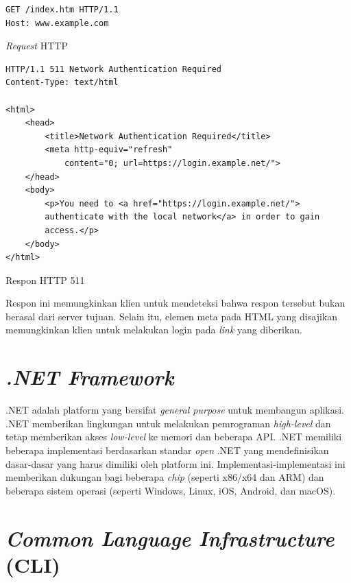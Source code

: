 \begin{listing}[h]
\begin{verbatim}
GET /index.htm HTTP/1.1
Host: www.example.com
\end{verbatim}
\caption{\textit{Request} HTTP}
\label{listing:request_http}
\end{listing}

\begin{listing}[h]
\begin{verbatim}
HTTP/1.1 511 Network Authentication Required
Content-Type: text/html

<html>
    <head>
        <title>Network Authentication Required</title>
        <meta http-equiv="refresh"
            content="0; url=https://login.example.net/">
    </head>
    <body>
        <p>You need to <a href="https://login.example.net/">
        authenticate with the local network</a> in order to gain
        access.</p>
    </body>
</html>
\end{verbatim}
\caption{Respon HTTP 511}
\label{listing:respon_http_511}
\end{listing}

Respon ini memungkinkan klien untuk mendeteksi bahwa respon tersebut bukan berasal dari server tujuan. Selain itu, elemen meta pada HTML yang disajikan memungkinkan klien untuk melakukan login pada \textit{link} yang diberikan.



\section{\textit{.NET Framework}}
\label{sec:net_framework}

.NET adalah platform yang bersifat \textit{general purpose} untuk membangun aplikasi\cite{NET_PRIMER:2016}. .NET memberikan lingkungan untuk melakukan pemrograman \textit{high-level} dan tetap memberikan akses \textit{low-level} ke memori dan beberapa API. .NET memiliki beberapa implementasi berdasarkan standar \textit{open} .NET yang mendefinisikan dasar-dasar yang harus dimiliki oleh platform ini. Implementasi-implementasi ini memberikan dukungan bagi beberapa \textit{chip} (seperti x86/x64 dan ARM) dan beberapa sistem operasi (seperti Windows, Linux, iOS, Android, dan macOS).



\section{\textit{Common Language Infrastructure} (CLI)}
\label{sec:cli}

